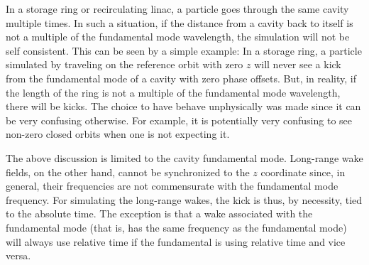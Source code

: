 In a storage ring or recirculating linac, a particle
goes through the same cavity multiple times. In such a situation, if
the distance from a cavity back to itself is not a multiple of the
fundamental mode wavelength, the simulation will not be self
consistent. This can be seen by a simple example: In a storage ring, a
particle simulated by \bmad traveling on the reference orbit with zero
$z$ will never see a kick from the fundamental mode of a cavity with
zero phase offsets. But, in reality, if the length of the ring is not
a multiple of the fundamental mode wavelength, there will be
kicks. The choice to have \bmad behave unphysically was made since it
can be very confusing otherwise. For example, it is potentially very
confusing to see non-zero closed orbits when one is not expecting it.

The above discussion is limited to the cavity fundamental mode.
Long-range wake fields, on the other hand, cannot be synchronized to
the $z$ coordinate since, in general, their frequencies are not
commensurate with the fundamental mode frequency. For simulating the
long-range wakes, the kick is thus, by necessity, tied to the absolute
time. The exception is that a wake associated with the fundamental
mode (that is, has the same frequency as the fundamental mode) will
always use relative time if the fundamental is using relative time and
vice versa.

